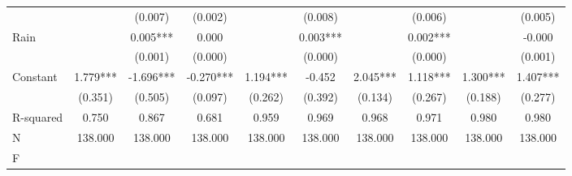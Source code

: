{\begin{tabular}{l*{9}{c}}
                    &               &     (0.007)   &     (0.002)   &               &     (0.008)   &               &     (0.006)   &               &     (0.005)   \\
Rain                &               &       0.005***&       0.000   &               &       0.003***&               &       0.002***&               &      -0.000   \\
                    &               &     (0.001)   &     (0.000)   &               &     (0.000)   &               &     (0.000)   &               &     (0.001)   \\
Constant            &       1.779***&      -1.696***&      -0.270***&       1.194***&      -0.452   &       2.045***&       1.118***&       1.300***&       1.407***\\
                    &     (0.351)   &     (0.505)   &     (0.097)   &     (0.262)   &     (0.392)   &     (0.134)   &     (0.267)   &     (0.188)   &     (0.277)   \\
\hline
R-squared           &       0.750   &       0.867   &       0.681   &       0.959   &       0.969   &       0.968   &       0.971   &       0.980   &       0.980   \\
N                   &     138.000   &     138.000   &     138.000   &     138.000   &     138.000   &     138.000   &     138.000   &     138.000   &     138.000   \\
F                   &               &               &               &               &               &               &               &               &               \\
\hline\hline
\end{tabular}
}
